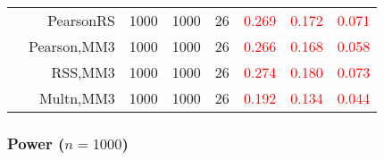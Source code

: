 \documentclass[
]{article}
\begin{document}
\begin{table}[H]
{\begin{tabular}[t]{lrrrrrrr}
\hspace{1em} & PearsonRS & 1000 & 1000 & 26 & \textcolor{red}{0.269} & \textcolor{red}{0.172} & \textcolor{red}{0.071}\\

\hspace{1em} & Pearson,MM3 & 1000 & 1000 & 26 & \textcolor{red}{0.266} & \textcolor{red}{0.168} & \textcolor{red}{0.058}\\

\hspace{1em} & RSS,MM3 & 1000 & 1000 & 26 & \textcolor{red}{0.274} & \textcolor{red}{0.180} & \textcolor{red}{0.073}\\

\hspace{1em} & Multn,MM3 & 1000 & 1000 & 26 & \textcolor{red}{0.192} & \textcolor{red}{0.134} & \textcolor{red}{0.044}\\
\bottomrule
\end{tabular}}
\endgroup{}
\end{table}

\hypertarget{power-n1000}{%
\subsubsection{\texorpdfstring{Power
(\(n=1000\))}{Power (n=1000)}}\label{power-n1000}}
\end{document}
